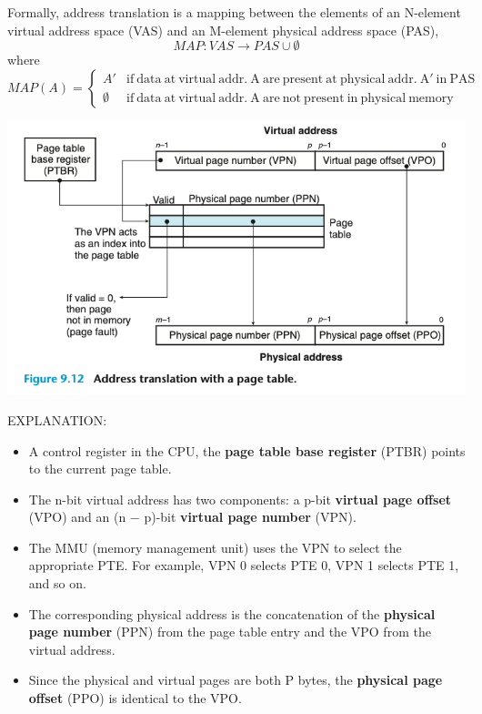 \documentclass[11pt]{article}
\begin{document}
Formally, address translation is a mapping between the elements of an N-element virtual address space (VAS) and an M-element physical address space (PAS),\\

\begin{equation}
MAP: VAS \rightarrow PAS \cup \emptyset
\end{equation}
where\\
\begin{equation}
MAP(A) = 
\begin{cases}
A' & \mathrm{if\ data\ at\ virtual\ addr.\ A\ are\ present\ at\ physical\ addr.\ A'\ in\ PAS } \\
\emptyset & \mathrm{if\ data\ at\ virtual\ addr.\ A\ are\ not\ present\ in\ physical\ memory}
\end{cases}
\end{equation}

\begin{center}
\includegraphics[width=.9\linewidth]{pics/figure9.12-address-translation.png}
\end{center}

EXPLANATION:\\
\begin{itemize}
\item A control register in the CPU, the \textbf{page table base register} (PTBR) points to the current page table.\\
\item The n-bit virtual address has two components: a p-bit \textbf{virtual page offset} (VPO) and an (n − p)-bit \textbf{virtual page number} (VPN).\\
\item The MMU (memory management unit) uses the VPN to select the appropriate PTE. For example, VPN 0 selects PTE 0, VPN 1 selects PTE 1, and so on.\\
\item The corresponding physical address is the concatenation of the \textbf{physical page number} (PPN) from the page table entry and the VPO from the virtual address.\\
\item Since the physical and virtual pages are both P bytes, the \textbf{physical page offset} (PPO) is identical to the VPO.\\
\end{itemize}
\end{document}
